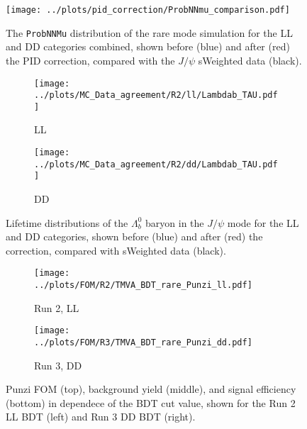 \begin{figure}
    \centering
    \texttt{[image: ../plots/pid\_correction/ProbNNmu\_comparison.pdf]}
    \caption{The \texttt{ProbNNMu} distribution of the rare mode simulation for the LL and DD categories combined,
    shown before (blue) and after (red) the PID correction, compared with the $J/\psi$ sWeighted data (black).}
    \label{fig:run2_pid_correction}
\end{figure}

\begin{figure}
    \centering
    \begin{subfigure}[b]{0.48\textwidth}
        \centering
        \texttt{[image: ../plots/MC\_Data\_agreement/R2/ll/Lambdab\_TAU.pdf]}
        \caption{LL}
    \end{subfigure}
    \hfill
    \begin{subfigure}[b]{0.48\textwidth}
        \centering
        \texttt{[image: ../plots/MC\_Data\_agreement/R2/dd/Lambdab\_TAU.pdf]}
        \caption{DD}
    \end{subfigure}
    \caption{Lifetime distributions of the $\Lambda_b^0$ baryon in the $J/\psi$ mode for the LL and DD categories, shown before (blue) and after (red) the correction,
    compared with sWeighted data (black).}
    \label{fig:run2_lifetime_correction}
\end{figure}

\begin{figure}
   \centering
    \begin{subfigure}[b]{0.48\textwidth}
        \centering
        \texttt{[image: ../plots/FOM/R2/TMVA\_BDT\_rare\_Punzi\_ll.pdf]}
        \caption{Run 2, LL}
    \end{subfigure}
    \hfill
    \begin{subfigure}[b]{0.48\textwidth}
        \centering
        \texttt{[image: ../plots/FOM/R3/TMVA\_BDT\_rare\_Punzi\_dd.pdf]}
        \caption{Run 3, DD}
    \end{subfigure}
    \caption{Punzi FOM (top), background yield (middle), and signal efficiency (bottom) in dependece of the BDT cut value, shown for the Run 2 LL BDT (left) and Run 3 DD BDT (right).}
    \label{fig:run2_kinematic_corrections}
\end{figure}

